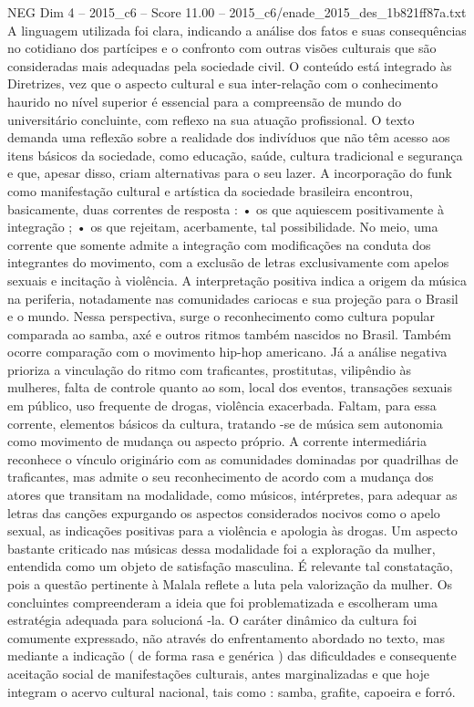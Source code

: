 \begin{textsample}{NEG Dim 4 – 2015\_c6 – Score 11.00 – 2015\_c6/enade\_2015\_des\_1b821ff87a.txt}
A linguagem utilizada foi clara, indicando a análise dos fatos e suas consequências no cotidiano dos partícipes e o confronto com outras visões culturais que são consideradas mais adequadas pela sociedade civil.
O conteúdo está integrado às Diretrizes, vez que o aspecto cultural e sua inter-relação com o conhecimento haurido no nível superior é essencial para a compreensão de mundo do universitário concluinte, com reflexo na sua atuação profissional.
O texto demanda uma reflexão sobre a realidade dos indivíduos que não têm acesso aos itens básicos da sociedade, como educação, saúde, cultura tradicional e segurança e que, apesar disso, criam alternativas para o seu lazer.
A incorporação do funk como manifestação cultural e artística da sociedade brasileira encontrou, basicamente, duas correntes de resposta : • os que aquiescem positivamente à integração ; • os que rejeitam, acerbamente, tal possibilidade.
No meio, uma corrente que somente admite a integração com modificações na conduta dos integrantes do movimento, com a exclusão de letras exclusivamente com apelos sexuais e incitação à violência.
A interpretação positiva indica a origem da música na periferia, notadamente nas comunidades cariocas e sua projeção para o Brasil e o mundo.
Nessa perspectiva, surge o reconhecimento como cultura popular comparada ao samba, axé e outros ritmos também nascidos no Brasil.
Também ocorre comparação com o movimento hip-hop americano.
Já a análise negativa prioriza a vinculação do ritmo com traficantes, prostitutas, vilipêndio às mulheres, falta de controle quanto ao som, local dos eventos, transações sexuais em público, uso frequente de drogas, violência exacerbada.
Faltam, para essa corrente, elementos básicos da cultura, tratando -se de música sem autonomia como movimento de mudança ou aspecto próprio.
A corrente intermediária reconhece o vínculo originário com as comunidades dominadas por quadrilhas de traficantes, mas admite o seu reconhecimento de acordo com a mudança dos atores que transitam na modalidade, como músicos, intérpretes, para adequar as letras das canções expurgando os aspectos considerados nocivos como o apelo sexual, as indicações positivas para a violência e apologia às drogas.
Um aspecto bastante criticado nas músicas dessa modalidade foi a exploração da mulher, entendida como um objeto de satisfação masculina.
É relevante tal constatação, pois a questão pertinente à Malala reflete a luta pela valorização da mulher.
Os concluintes compreenderam a ideia que foi problematizada e escolheram uma estratégia adequada para solucioná -la.
O caráter dinâmico da cultura foi comumente expressado, não através do enfrentamento abordado no texto, mas mediante a indicação ( de forma rasa e genérica ) das dificuldades e consequente aceitação social de manifestações culturais, antes marginalizadas e que hoje integram o acervo cultural nacional, tais como : samba, grafite, capoeira e forró.

\end{textsample}
